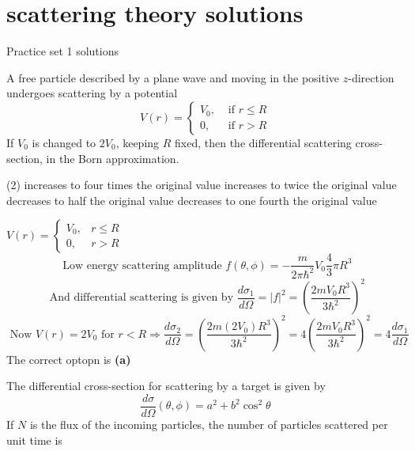 \chapter{scattering theory solutions}
\begin{abox}
	Practice set 1 solutions
	\end{abox}
\begin{enumerate}
	\begin{minipage}{\textwidth}
		\item A free particle described by a plane wave and moving in the positive $z$-direction undergoes scattering by a potential
		$$
		V(r)= \begin{cases}V_{0}, & \text { if } r \leq R \\ 0, & \text { if } r>R\end{cases}
		$$
		If $V_{0}$ is changed to $2 V_{0}$, keeping $R$ fixed, then the differential scattering cross-section, in the Born approximation.
	\end{minipage}
	\begin{tasks}(2)
		\task[\textbf{A.}]increases to four times the original value
		\task[\textbf{B.}]increases to twice the original value
		\task[\textbf{C.}]decreases to half the original value
		\task[\textbf{D.}]decreases to one fourth the original value
	\end{tasks}
\begin{answer}
	$V(r)= \begin{cases}V_{0}, & r \leq R \\ 0, & r>R\end{cases}$\\
	$$\text { Low energy scattering amplitude } f(\theta, \phi)=-\frac{m}{2 \pi \hbar^{2}} V_{0} \frac{4}{3} \pi R^{3}$$
	$$\text { And differential scattering is given by } \frac{d \sigma_{1}}{d \Omega}=|f|^{2}=\left(\frac{2 m V_{0} R^{3}}{3 \hbar^{2}}\right)^{2}$$
	$$\text { Now } V(r)=2 V_{0} \text { for } r<R \Rightarrow \frac{d \sigma_{2}}{d \Omega}=\left(\frac{2 m\left(2 V_{0}\right) R^{3}}{3 \hbar^{2}}\right)^{2}=4\left(\frac{2 m V_{0} R^{3}}{3 \hbar^{2}}\right)^{2}=4 \frac{d \sigma_{1}}{d \Omega}$$
	The correct optopn is \textbf{(a)}
\end{answer}
\begin{minipage}{\textwidth}
	\item The differential cross-section for scattering by a target is given by
	$$
	\frac{d \sigma}{d \Omega}(\theta, \phi)=a^{2}+b^{2} \cos ^{2} \theta
	$$
	If $N$ is the flux of the incoming particles, the number of particles scattered per unit time is

\end{minipage}
\end{enumerate}
